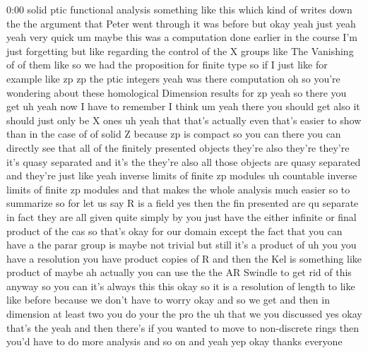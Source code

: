 \begin{unfinished}{0:00}
solid  ptic  functional  analysis  something
like  this  which  kind  of  writes  down  the
the  argument  that  Peter  went  through  it
was  before  but
okay
yeah  just  yeah
yeah  very  quick  um  maybe  this  was  a
computation  done  earlier  in  the  course
I'm  just  forgetting  but  like  regarding
the  control  of  the  X  groups  like  The
Vanishing  of  of  them  like  so  we  had  the
proposition  for  finite  type  so  if  I  just
like  for  example  like  zp  zp  the  ptic
integers  yeah  was  there
computation  oh  so  you're  wondering  about
these  homological  Dimension  results  for
zp  yeah  so  there  you  get  uh  yeah  now  I
have  to  remember  I
think  um  yeah  there  you  should  get  also
it  should  just  only  be  X  ones  uh  yeah
that  that's  actually  even  that's  easier
to  show  than  in  the  case  of  of  solid  Z
because  zp  is  compact  so  you  can  there
you  can  directly  see  that  all  of  the
finitely  presented  objects  they're  also
they're  they're  it's  quasy  separated  and
it's
the  they're  also  all  those  objects  are
quasy  separated  and  they're  just  like
yeah  inverse  limits  of  finite  zp  modules
uh  countable  inverse  limits  of  finite  zp
modules  and  that  makes  the  whole
analysis  much
easier  so  to  summarize  so  for  let  us  say
R  is  a  field  yes
then  the  fin  presented  are  qu  separate
in  fact  they  are  all  given  quite  simply
by  you  just  have  the  either  infinite  or
final  product  of  the  cas  so  that's  okay
for  our
domain  except  the  fact  that  you  can  have
a  the  parar  group  is  maybe  not  trivial
but  still  it's  a  product  of  uh  you  you
have  a  resolution  you  have  product
copies  of  R  and  then  the  Kel  is
something  like  product  of  maybe  ah
actually  you  can  use  the  the  AR  Swindle
to  get  rid  of  this  anyway  so  you  can
it's  always  this
this  okay  so  it  is  a  resolution  of
length  to  like  like  before  because  we
don't  have  to  worry  okay  and  so  we  get
and  then  in  dimension  at  least  two  you
do  your  the  pro  the  uh  that  we  you
discussed  yes  okay  that's  the  yeah  and
then  there's  if  you  wanted  to  move  to
non-discrete  rings  then  you'd  have  to  do
more  analysis  and  so  on  and
yeah
yep  okay  thanks
everyone
\end{unfinished}